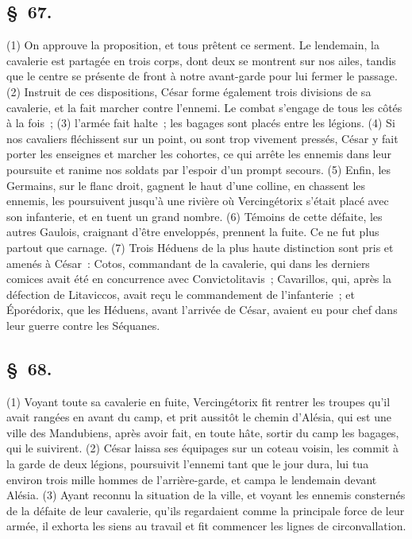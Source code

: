 \documentclass[french,twoside]{book} %
\begin{document}
\subsection[{§ 67.}]{ \textsc{§ 67.} }
\noindent (1) On approuve la proposition, et tous prêtent ce serment. Le lendemain, la cavalerie est partagée en trois corps, dont deux se montrent sur nos ailes, tandis que le centre se présente de front à notre avant-garde pour lui fermer le passage. (2) Instruit de ces dispositions, César forme également trois divisions de sa cavalerie, et la fait marcher contre l’ennemi. Le combat s’engage de tous les côtés à la fois ; (3) l’armée fait halte ; les bagages sont placés entre les légions. (4) Si nos cavaliers fléchissent sur un point, ou sont trop vivement pressés, César y fait porter les enseignes et marcher les cohortes, ce qui arrête les ennemis dans leur poursuite et ranime nos soldats par l’espoir d’un prompt secours. (5) Enfin, les Germains, sur le flanc droit, gagnent le haut d’une colline, en chassent les ennemis, les poursuivent jusqu’à une rivière où Vercingétorix s’était placé avec son infanterie, et en tuent un grand nombre. (6) Témoins de cette défaite, les autres Gaulois, craignant d’être enveloppés, prennent la fuite. Ce ne fut plus partout que carnage. (7) Trois Héduens de la plus haute distinction sont pris et amenés à César : Cotos, commandant de la cavalerie, qui dans les derniers comices avait été en concurrence avec Convictolitavis ; Cavarillos, qui, après la défection de Litaviccos, avait reçu le commandement de l’infanterie ; et Éporédorix, que les Héduens, avant l’arrivée de César, avaient eu pour chef dans leur guerre contre les Séquanes.
\subsection[{§ 68.}]{ \textsc{§ 68.} }
\noindent (1) Voyant toute sa cavalerie en fuite, Vercingétorix fit rentrer les troupes qu’il avait rangées en avant du camp, et prit aussitôt le chemin d’Alésia, qui est une ville des Mandubiens, après avoir fait, en toute hâte, sortir du camp les bagages, qui le suivirent. (2) César laissa ses équipages sur un coteau voisin, les commit à la garde de deux légions, poursuivit l’ennemi tant que le jour dura, lui tua environ trois mille hommes de l’arrière-garde, et campa le lendemain devant Alésia. (3) Ayant reconnu la situation de la ville, et voyant les ennemis consternés de la défaite de leur cavalerie, qu’ils regardaient comme la principale force de leur armée, il exhorta les siens au travail et fit commencer les lignes de circonvallation.
\end{document}
